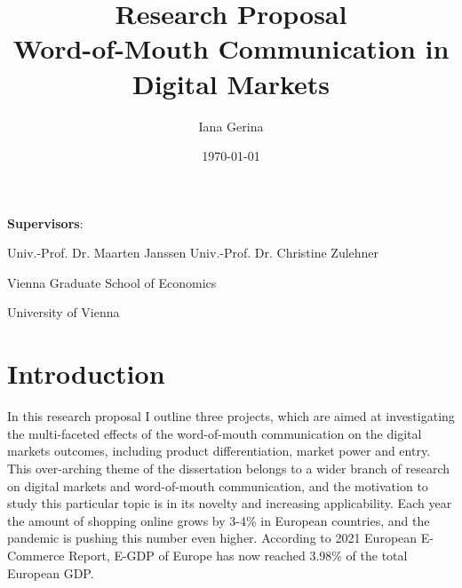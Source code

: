 \documentclass[13pt]{article}
\title{\textbf{Research Proposal} \\ Word-of-Mouth Communication in Digital Markets}
\author{Iana Gerina} %
\numberwithin{figure}{section}
\numberwithin{table}{section}
\theoremstyle{indented}
\numberwithin{equation}{section} %
\begin{document}
\maketitle
\thispagestyle{empty}




\begin{center} 
\Large \textbf{Supervisors}:

\vspace{14ex}
\large Univ.-Prof. Dr. Maarten Janssen
\hspace{10ex} Univ.-Prof. Dr. Christine Zulehner

\vspace{16ex}

Vienna Graduate School of Economics

University of Vienna
\vspace{4ex}

\date{\today}
\end{center}


\clearpage
\section{Introduction} \label{motivation}
\fontsize{13.5}{14.4}\selectfont
In this research proposal I outline three projects, which are aimed at investigating the multi-faceted effects of the word-of-mouth communication on the digital markets outcomes, including product differentiation, market power and entry. This over-arching theme of the dissertation belongs to a wider branch of research on digital markets and word-of-mouth communication, and the motivation to study this particular topic is in its novelty and increasing applicability. Each year the amount of shopping online grows by 3-4\% in European countries, and the pandemic is pushing this number even higher. According to 2021 European E-Commerce Report, E-GDP of Europe has now reached 3.98\% of the total European GDP.  
\end{document}
